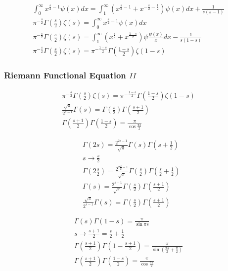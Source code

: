 	$$
	\begin{gathered}
		\int_0^{\infty} x^{\frac{s}{2}-1} \psi(x) d x=\int_1^{\infty}\left(x^{\frac{s}{2}-1}+x^{-\frac{s}{2}-\frac{1}{2}}\right) \psi(x) d x+\frac{1}{s(s-1)} \\
		\pi^{-\frac{s}{2}} \Gamma\left(\frac{s}{2}\right) \zeta(s)=\int_0^{\infty} x^{\frac{s}{2}-1} \psi(x) d x \\
		\pi^{-\frac{s}{2}} \Gamma\left(\frac{s}{2}\right) \zeta(s)=\int_1^{\infty}\left(x^{\frac{s}{2}}+x^{\frac{1-s}{2}}\right) \psi \frac{\psi(x)}{x} d x-\frac{1}{s(1-s)} \\
		\pi^{-\frac{s}{2}} \Gamma\left(\frac{s}{2}\right) \zeta(s)=\pi^{-\frac{1-s}{2}} \Gamma\left(\frac{1-s}{2}\right) \zeta(1-s)
	\end{gathered}
	$$
	
	\subsubsection{Riemann Functional Equation $\RNumb{2}$}
	
	$$
	\begin{gathered}
		\pi^{-\frac{s}{2}} \Gamma\left(\frac{s}{2}\right) \zeta(s)=\pi^{-\frac{1-s}{2}} \Gamma\left(\frac{1-s}{2}\right) \zeta(1-s) \\
		\frac{\sqrt{\pi}}{2^{s-1}} \Gamma(s)=\Gamma\left(\frac{s}{2}\right) \Gamma\left(\frac{s+1}{2}\right) \\
		\Gamma\left(\frac{s+1}{2}\right) \Gamma\left(\frac{1-s}{2}\right)=\frac{\pi}{\cos \frac{\pi s}{2}}
	\end{gathered}
	$$
	
	$$
	\begin{aligned}
		& \Gamma(2 s)=\frac{2^{2 s-1}}{\sqrt{\pi}} \Gamma(s) \Gamma\left(s+\frac{1}{2}\right) \\
		& s \rightarrow \frac{s}{2} \\
		& \Gamma\left(2 \frac{s}{2}\right)=\frac{2^{2 \frac{s}{2}-1}}{\sqrt{\pi}} \Gamma\left(\frac{s}{2}\right) \Gamma\left(\frac{s}{2}+\frac{1}{2}\right) \\
		& \Gamma(s)=\frac{2^{s-1}}{\sqrt{\pi}} \Gamma\left(\frac{s}{2}\right) \Gamma\left(\frac{s+1}{2}\right) \\
		& \frac{\sqrt{\pi}}{2^{s-1}} \Gamma(s)=\Gamma\left(\frac{s}{2}\right) \Gamma\left(\frac{s+1}{2}\right)
	\end{aligned}
	$$
	
	$$
	\begin{gathered}
		\Gamma(s) \Gamma(1-s)=\frac{\pi}{\sin \pi s} \\
		s \rightarrow \frac{s+1}{2}=\frac{s}{2}+\frac{1}{2} \\
		\Gamma\left(\frac{s+1}{2}\right) \Gamma\left(1-\frac{s+1}{2}\right)=\frac{\pi}{\sin \left(\frac{\pi s}{2}+\frac{\pi}{2}\right)} \\
		\Gamma\left(\frac{s+1}{2}\right) \Gamma\left(\frac{1-s}{2}\right)=\frac{\pi}{\cos \frac{\pi s}{2}}
	\end{gathered}
	$$
	
